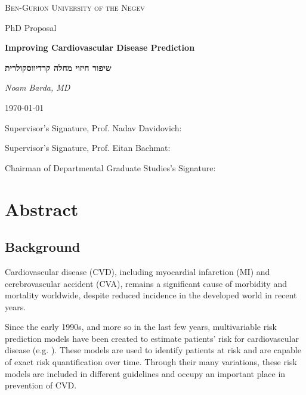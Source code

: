 \documentclass[a4paper,12pt]{article}
\begin{document}
	\begin{titlepage}
		\centering
		{\scshape\LARGE Ben-Gurion University of the Negev\par}
		\vspace{1cm}
		{\Large PhD Proposal\par}
		\vspace{2cm}
		{\huge\bfseries Improving Cardiovascular Disease Prediction\par}
		\vspace{1cm}
		\begin{hebrew}
		{\huge\bfseries שיפור חיזוי מחלה קרדיווסקולרית\par}
		\end{hebrew}
		\vspace{1.5cm}
		{\Large\itshape Noam Barda, MD\par}
		{\large \today\par}
		\vfill
		Supervisor's Signature, Prof. Nadav Davidovich: \underline{\hspace{5cm}}\par
		\vspace{0.5cm}
		Supervisor's Signature, Prof. Eitan Bachmat: \underline{\hspace{5cm}}\par
		\vspace{0.5cm}
		Chairman of Departmental Graduate Studies's Signature: \underline{\hspace{5cm}}\par
		
	\end{titlepage}
	
	\tableofcontents
	\newpage
	
	\section{Abstract}
	
		\subsection{Background}
		
		Cardiovascular disease (CVD), including myocardial infarction (MI) and cerebrovascular accident (CVA), remains a significant cause of morbidity and mortality worldwide\cite{ODonnell2016}, despite reduced incidence in the developed world in recent years\cite{Koton2014,Vangen-Loenne2017}.
		
		Since the early 1990s, and more so in the last few years,  multivariable risk prediction models have been created to estimate patients' risk for cardiovascular disease (e.g. \cite{Wilson1998,Conroy2003,DAgostino2008}). These models are used to identify patients at risk and are capable of exact risk quantification over time\cite{Goff2014}. Through their many variations, these risk models are included in different guidelines and occupy an important place in prevention of CVD\cite{Goff2014}.
	
\end{document}
